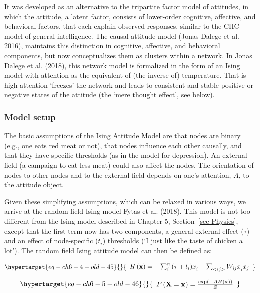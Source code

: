\documentclass[
  a4paper,
  DIV=11,
  numbers=noendperiod]{scrreprt}
\begin{document}
It was developed as an alternative to the tripartite factor model of
attitudes, in which the attitude, a latent factor, consists of
lower-order cognitive, affective, and behavioral factors, that each
explain observed responses, similar to the CHC model of general
intelligence. The causal attitude model (Jonas Dalege et al. 2016),
maintains this distinction in cognitive, affective, and behavioral
components, but now conceptualizes them as clusters within a network. In
Jonas Dalege et al. (2018), this network model is formalized in the form
of an Ising model with attention as the equivalent of (the inverse of)
temperature. That is high attention `freezes' the network and leads to
consistent and stable positive or negative states of the attitude (the
`mere thought effect', see below).

\hypertarget{sec-Model-setup}{%
\subsubsection{Model setup}\label{sec-Model-setup}}

The basic assumptions of the Ising Attitude Model are that nodes are
binary (e.g., one eats red meat or not), that nodes influence each other
causally, and that they have specific thresholds (as in the model for
depression). An external field (a campaign to eat less meat) could also
affect the nodes. The orientation of nodes to other nodes and to the
external field depends on one's attention, \(A\), to the attitude
object.

Given these simplifying assumptions, which can be relaxed in various
ways, we arrive at the random field Ising model Fytas et al. (2018).
This model is not too different from the Ising model described in
Chapter 5, Section~\ref{sec-Physics}, except that the first term now has
two components, a general external effect (\(\tau\)) and an effect of
node-specific (\(t_{i}\)) thresholds (`I just like the taste of chicken
a lot'). The random field Ising attitude model can then be defined as:

\begin{equation}\protect\hypertarget{eq-ch6-4-old-45}{}{\begin{array}{r}
H\left( \mathbf{x} \right) = - \sum_{i}^{n}{(\tau + {t_{i})x}_{i}} - \sum_{< ij >}^{}{{W_{ij}x}_{i}x_{j}}
\end{array}}\label{eq-ch6-4-old-45}\end{equation}

\begin{equation}\protect\hypertarget{eq-ch6-5-old-46}{}{\begin{array}{r}
P\left( \mathbf{X} = \mathbf{x} \right) = \frac{\exp\left( - AH\left( \mathbf{x} \right) \right)}{Z}
\end{array}}\label{eq-ch6-5-old-46}\end{equation}
\end{document}
